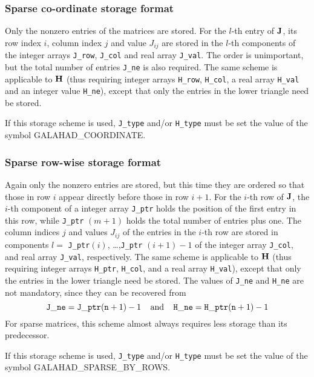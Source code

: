 \documentclass{galahad}
\newcommand{\sym}{\sf\small}
\begin{document}
\subsubsection{Sparse co-ordinate storage format}\label{coordinate}

Only the nonzero entries of the matrices are stored. For the
$l$-th entry of ${\mathbf{J}}$, its row index $i$, column index $j$
and value $J_{ij}$
are stored in the $l$-th components of the integer arrays {\tt J\_row},
{\tt J\_col} and real array {\tt J\_val}.
The order is unimportant, but the total
number of entries {\tt J\_ne} is also required.
The same scheme is applicable to
${\mathbf{H}}$ (thus requiring integer arrays {\tt H\_row}, {\tt H\_col}, a real array
{\tt H\_val} and an integer value {\tt H\_ne}),
except that only the entries in the lower triangle need be stored.

\noindent
If this storage scheme is used, {\tt J\_type} and/or {\tt H\_type} must be set
the value of the symbol {\sym GALAHAD\_COORDINATE}.

\subsubsection{Sparse row-wise storage format}\label{rowwise}

Again only the nonzero entries are stored, but this time
they are ordered so that those in row $i$ appear directly before those
in row $i+1$. For the $i$-th row of ${\mathbf{J}}$, the $i$-th component of a
integer array {\tt J\_ptr} holds the position of the first entry in this row,
while {\tt J\_ptr} $(m+1)$ holds the total number of entries plus one.
The column indices $j$ and values $J_{ij}$ of the entries in the $i$-th row
are stored in components
$l =$ {\tt J\_ptr}$(i)$, \ldots ,{\tt J\_ptr} $(i+1)-1$ of the
integer array {\tt J\_col}, and real array {\tt J\_val}, respectively.
The same scheme is applicable to
${\mathbf{H}}$ (thus requiring integer arrays {\tt H\_ptr}, {\tt H\_col}, and
a real array {\tt H\_val}),
except that only the entries in the lower triangle need be stored.
The values of {\tt J\_ne} and {\tt H\_ne} are not mandatory, since they can be
recovered from
\[
{\tt J\_ne} = {\tt J\_ptr}({\tt n}+1) - 1
\;\;\;\; \mbox{and} \;\;\;\;
{\tt H\_ne} = {\tt H\_ptr}({\tt n}+1) - 1
\]
For sparse matrices, this scheme almost always requires less storage than
its predecessor.

\noindent
If this storage scheme is used, {\tt J\_type} and/or {\tt H\_type} must be set
the value of the symbol {\sym GALAHAD\_SPARSE\_BY\_ROWS}.
\end{document}
